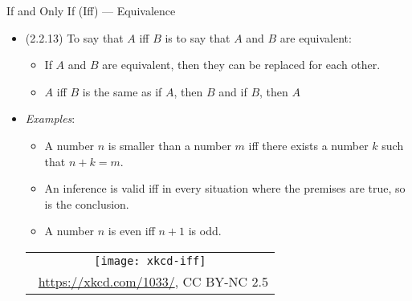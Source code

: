 \begin{frame}{If and Only If (Iff) --- Equivalence}

\begin{itemize}

	\item (2.2.13) To say that $A$ iff $B$ is to say that $A$ and $B$ are equivalent:
	
	\begin{itemize}
	
		\item If $A$ and $B$ are equivalent, then they can be replaced for each other.
		
		\item $A$ iff $B$ is the same as if $A$, then $B$ and if $B$, then $A$
	
	\end{itemize}
	
	\item \emph{Examples}:
	
	\begin{itemize}
	
		\item A number $n$ is smaller than a number $m$ iff there exists a number $k$ such that $n+k=m$.
		
		\item An inference is valid iff in every situation where the premises are true, so is the conclusion.
		
		\item A number $n$ is even iff $n+1$ is odd.
	
	\end{itemize}
	
		\begin{center}
		\begin{tabular}{c}
		\texttt{[image: xkcd-iff]}\\[-1ex]
		{\tiny \textcopyright~\url{https://xkcd.com/1033/}, CC BY-NC 2.5}
		\end{tabular}
		\end{center}

\end{itemize}

\end{frame}

